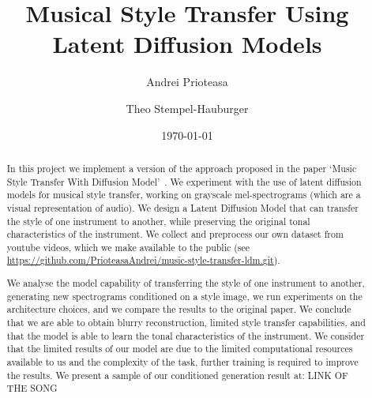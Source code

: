 \documentclass[12pt]{article}
\title{Musical Style Transfer Using Latent Diffusion Models}
\author{Andrei Prioteasa \and Theo Stempel-Hauburger}
\date{\today}
\begin{document}
\maketitle

\tableofcontents
\begin{abstract}
    \noindent In this project we implement a version of the approach proposed in the paper `Music Style Transfer With Diffusion Model'~\cite{huang2024music}. We experiment with the use of latent diffusion models for musical style transfer, working on grayscale mel-spectrograms (which are a visual representation of audio). We design a Latent Diffusion Model that can transfer the style of one instrument to another, while preserving the original tonal characteristics of the instrument. We collect and preprocess our own dataset from youtube videos, which we make available to the public (see \url{https://github.com/PrioteasaAndrei/music-style-transfer-ldm.git}). 
    
    We analyse the model capability of transferring the style of one instrument to another, generating new spectrograms conditioned on a style image, we run experiments on the architecture choices, and we compare the results to the original paper. We conclude that we are able to obtain blurry reconstruction, limited style transfer capabilities, and that the model is able to learn the tonal characteristics of the instrument. We consider that the limited results of our model are due to the limited computational resources available to us and the complexity of the task, further training is required to improve the results. We present a sample of our conditioned generation result at: LINK OF THE SONG
   
\end{abstract}










\end{document}

